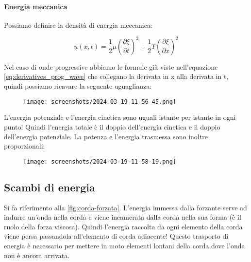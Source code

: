 \paragraph{Energia meccanica}
Possiamo definire la densità di energia meccanica:
\begin{definition}
	\[
		u(x,t) = \frac{1}{2} \mu \left( \frac{\partial \xi }{\partial t}  \right) ^{2} + \frac{1}{2}T\left( \frac{\partial \xi }{\partial x}  \right) ^{2}
	\]
\end{definition}
Nel caso di onde progressive abbiamo le formule già viste nell'equazione \eqref{eq:derivatives_prog_wave} che collegano la derivata in x alla derivata in t, quindi possiamo ricavare la seguente uguaglianza:
\begin{figure}[H]
	\centering
	\texttt{[image: screenshots/2024-03-19-11-56-45.png]}
\end{figure}
L'energia potenziale e l'energia cinetica sono uguali istante per istante in ogni punto! Quindi l'energia totale è il doppio dell'energia cinetica e il doppio dell'energia potenziale. La potenza e l'energia trasmessa sono inoltre proporzionali:
\begin{figure}[H]
	\centering
	\texttt{[image: screenshots/2024-03-19-11-58-19.png]}
\end{figure}

\subsection{Scambi di energia}
Si fa riferimento alla \autoref{fig:corda-forzata}. L'energia immessa dalla forzante serve ad indurre un'onda nella corda e viene incamerata dalla corda nella sua forma (è il ruolo della forza viscosa). Quindi l'energia raccolta da ogni elemento della corda viene persa passandola all'elemento di corda adiacente! Questo trasporto di energia è necessario per mettere in moto elementi lontani della corda dove l'onda non è ancora arrivata.

